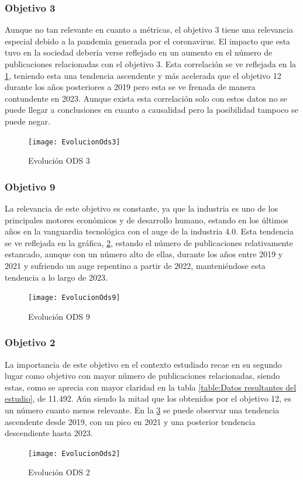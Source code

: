 \subsubsection{Objetivo 3}
Aunque no tan relevante en cuanto a métricas, el objetivo 3 tiene una relevancia especial debido a la pandemia generada por el coronavirus. El impacto que esta tuvo en la sociedad debería verse reflejado en un aumento en el número de publicaciones relacionadas con el objetivo 3. Esta correlación se ve reflejada en la \cref{fig:Evolución ODS 3}, teniendo esta una tendencia ascendente y más acelerada que el objetivo 12 durante los años posteriores a 2019 pero esta se ve frenada de manera contundente en 2023. Aunque exista esta correlación solo con estos datos no se puede llegar a conclusiones en cuanto a causalidad pero la posibilidad tampoco se puede negar.

\begin{figure}[H]
    \centering
    \texttt{[image: EvolucionOds3]}
    \captionsetup{justification=centering}
    \caption{Evolución ODS 3}
    \label{fig:Evolución ODS 3}
\end{figure}

\subsubsection{Objetivo 9}
La relevancia de este objetivo es constante, ya que la industria es uno de los principales motores económicos y de desarrollo humano, estando en los últimos años en la vanguardia tecnológica con el auge de la industria 4.0. Esta tendencia se ve reflejada en la gráfica, \cref{fig:Evolución ODS 9}, estando el número de publicaciones relativamente estancado, aunque con un número alto de ellas, durante los años entre 2019 y 2021 y sufriendo un auge repentino a partir de 2022, manteniéndose esta tendencia a lo largo de 2023.
\begin{figure}[H]
    \centering
    \texttt{[image: EvolucionOds9]}
    \captionsetup{justification=centering}
    \caption{Evolución ODS 9}
    \label{fig:Evolución ODS 9}
\end{figure}

\subsubsection{Objetivo 2}
La importancia de este objetivo en el contexto estudiado recae en su segundo lugar como objetivo con mayor número de publicaciones relacionadas, siendo estas, como se aprecia con mayor claridad en la tabla \cref{table:Datos resultantes del estudio}, de 11.492. Aún siendo la mitad que los obtenidos por el objetivo 12, es un número cuanto menos relevante. En la \cref{fig:Evolución ODS 2} se puede observar una tendencia ascendente desde 2019, con un pico en 2021 y una posterior tendencia descendiente hasta 2023.
\begin{figure}[H]
    \centering
    \texttt{[image: EvolucionOds2]}
    \captionsetup{justification=centering}
    \caption{Evolución ODS 2}
    \label{fig:Evolución ODS 2}
\end{figure}

